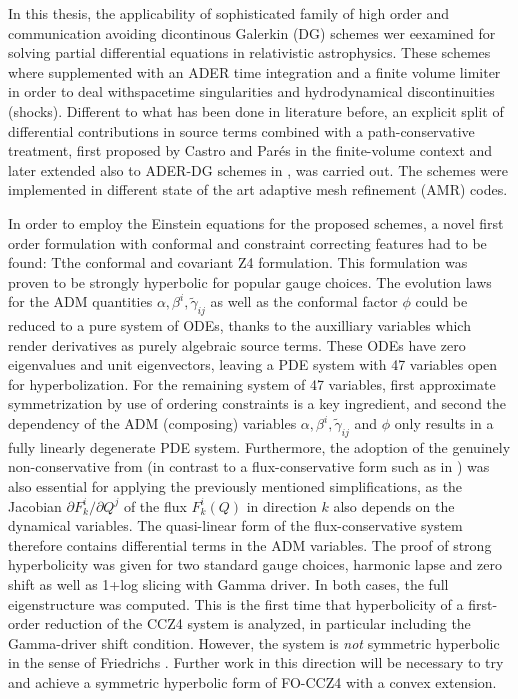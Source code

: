 
\vspace{.5cm} %
\begin{fullwidth}

In this thesis, the applicability of sophisticated family of high order and 
communication avoiding dicontinous Galerkin (DG) schemes wer eexamined for
solving partial differential equations in relativistic astrophysics.
These schemes where supplemented with an ADER time integration and a finite
volume limiter in order to deal withspacetime singularities and hydrodynamical 
discontinuities (\ie shocks).
Different to what has been done in literature before, an
explicit split of differential contributions in source terms combined with
a path-conservative treatment, first proposed by Castro and Par\'es in the 
finite-volume context \cite{Castro2006,Pares2006} and later extended also
to ADER-DG schemes in \cite{Dumbser2009a,Dumbser2010}, was carried out. The
schemes were implemented in different state of the art
adaptive mesh refinement (AMR) codes.

In order to employ the Einstein equations for the proposed schemes, a novel 
first order formulation with conformal and constraint correcting features had to
be found: Tthe conformal and covariant Z4 formulation. This formulation was
proven to be strongly hyperbolic for popular gauge choices. The evolution
laws for the ADM quantities $\alpha,\beta^i,\tilde{\gamma}_{ij}$ as well as the
conformal factor $\phi$ 
could be reduced to a pure system of ODEs, thanks to the auxilliary variables
which render derivatives as purely algebraic source terms. These ODEs have
zero eigenvalues and unit eigenvectors, leaving a PDE system with 47 variables
open for hyperbolization. For the remaining system of 47 variables, first
approximate symmetrization by use of ordering constraints is a key ingredient,
and second the dependency of the ADM (composing) variables $\alpha,
\beta^i, \tilde{\gamma}_{ij}$ and $\phi$ only results in a fully
linearly degenerate PDE system. Furthermore, the adoption of the genuinely
non-conservative from (in contrast to a flux-conservative form such as in
\cite{Bona97a,Alic:2009}) was also essential for applying the previously
mentioned simplifications, as the Jacobian $\partial F^i_k / \partial Q^j$
of the flux $F^i_k(Q)$ in direction $k$ also depends on the dynamical
variables. The
quasi-linear form of the flux-conservative system therefore contains
differential terms in the ADM variables. The proof
of strong hyperbolicity was given for two standard gauge choices, \ie 
harmonic lapse and zero shift as well as 1+log slicing with Gamma driver. In
both cases, the full eigenstructure was computed. This is the first time
that hyperbolicity of a first-order reduction of the CCZ4 system is
analyzed, in particular including the Gamma-driver shift condition.
However, the system is \emph{not} symmetric hyperbolic in the sense of
Friedrichs \cite{Friedrichs1954}. Further work
in this direction will be necessary to try and achieve a symmetric
hyperbolic form of FO-CCZ4 with a convex extension.


\end{fullwidth}
